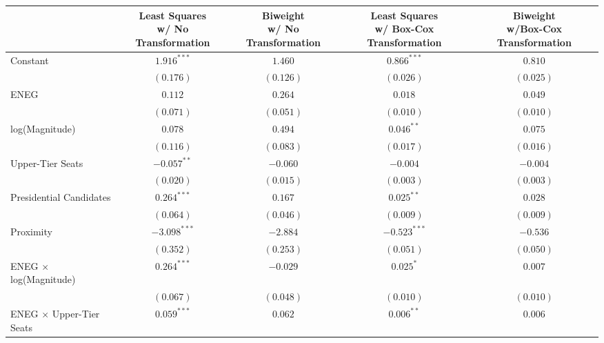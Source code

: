 
\begin{tabular}{l c c c c }
\hline
                                           & \specialcell{Least Squares\\w/ No Transformation} & \specialcell{Biweight\\w/ No Transformation} & \specialcell{Least Squares\\w/ Box-Cox Transformation} & \specialcell{Biweight\\w/Box-Cox Transformation} \\
\hline
Constant                                   & $1.916^{***}$  & $1.460$   & $0.866^{***}$  & $0.810$   \\
                                           & $(0.176)$      & $(0.126)$ & $(0.026)$      & $(0.025)$ \\
ENEG                                       & $0.112$        & $0.264$   & $0.018$        & $0.049$   \\
                                           & $(0.071)$      & $(0.051)$ & $(0.010)$      & $(0.010)$ \\
log(Magnitude)                             & $0.078$        & $0.494$   & $0.046^{**}$   & $0.075$   \\
                                           & $(0.116)$      & $(0.083)$ & $(0.017)$      & $(0.016)$ \\
Upper-Tier Seats                           & $-0.057^{**}$  & $-0.060$  & $-0.004$       & $-0.004$  \\
                                           & $(0.020)$      & $(0.015)$ & $(0.003)$      & $(0.003)$ \\
Presidential Candidates                    & $0.264^{***}$  & $0.167$   & $0.025^{**}$   & $0.028$   \\
                                           & $(0.064)$      & $(0.046)$ & $(0.009)$      & $(0.009)$ \\
Proximity                                  & $-3.098^{***}$ & $-2.884$  & $-0.523^{***}$ & $-0.536$  \\
                                           & $(0.352)$      & $(0.253)$ & $(0.051)$      & $(0.050)$ \\
ENEG $\times$ log(Magnitude)               & $0.264^{***}$  & $-0.029$  & $0.025^{*}$    & $0.007$   \\
                                           & $(0.067)$      & $(0.048)$ & $(0.010)$      & $(0.010)$ \\
ENEG $\times$ Upper-Tier Seats             & $0.059^{***}$  & $0.062$   & $0.006^{**}$   & $0.006$   \\

\end{tabular}
